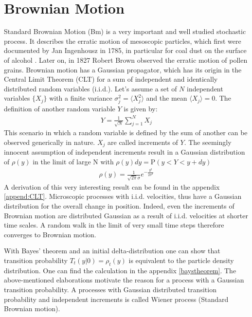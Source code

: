 \documentclass[
  a4paper,BCOR10mm,oneside,
  headsepline,footsepline,%
  fleqn,openbib
]{scrbook}
\begin{document}
\section{Brownian Motion}
Standard Brownian Motion (Bm) is a very important and well studied stochastic process. It describes the erratic motion of mesoscopic particles, which first were documented by Jan Ingenhousz in 1785, in particular for coal dust on the surface of alcohol \cite{Hofling2013}. Later on, in 1827 Robert Brown observed the erratic motion of pollen grains. Brownian motion has a Gaussian propagator, which has its origin in the Central Limit Theorem (CLT) for a sum of independent and identically distributed random variables (i.i.d.). Let's assume a set of $N$ independent variables $\{X_j\}$ with a finite variance $ \sigma_j^2=\langle X_{j}^2\rangle $ and the mean $\langle X_{j}\rangle = 0$. The definition of another random variable $Y$ is given by:
 \begin{align}
  Y = \frac{1}{\sqrt{N}} \sum_{j=1}^N X_j \label{eq:CLT}
 \end{align}
This scenario in which a random variable is defined by the sum of another can be observed generically in nature. $X_j$ are called increments of $Y$. The seemingly innocent assumption of independent increments result in a Gaussian distribution of $\rho(y)$ in the limit of large N with $\rho(y)dy=\mathrm{P}(y<Y<y+dy)$ 
\begin{align}
 \rho(y) =\frac{1}{\sqrt{2 \pi} \sigma } e^{-\frac{y^2}{2 \sigma^2}}
\end{align}
A derivation of this very interesting result can be found in the appendix \ref{append:CLT}.    Microscopic processes with i.i.d. velocities, thus have a Gaussian distribution for the overall change in position. Indeed, even the increments of Brownian motion are distributed Gaussian as a result of i.i.d. velocities at shorter time scales. A random walk in the limit of very small time steps therefore converges to Brownian motion. \par With  Bayes' theorem and an initial delta-distribution one can show that transition probability $T_{t}(y|0) = \rho_{t}(y)$ is equivalent to the particle density distribution. One can find the calculation in the appendix \cref{baystheorem}. The above-mentioned elaborations motivate the reason for a process with a Gaussian transition probability. A processes with Gaussian distributed transition probability and independent increments is called Wiener process (Standard Brownian motion).\par
\end{document}
